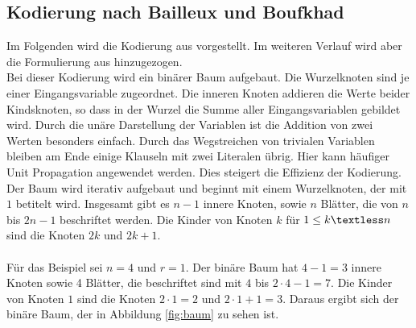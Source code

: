 \documentclass[a4,abstract=on]{scrartcl}
\begin{document}
	\subsection{Kodierung nach Bailleux und Boufkhad}
Im Folgenden wird die Kodierung aus \citet[][]{bailleux} vorgestellt. Im weiteren Verlauf wird aber die Formulierung aus \citet[][]{knuth} hinzugezogen.\\
Bei dieser Kodierung wird ein binärer Baum aufgebaut. Die Wurzelknoten sind je einer Eingangsvariable zugeordnet. Die inneren Knoten addieren die Werte beider Kindsknoten, so dass in der Wurzel die Summe aller Eingangsvariablen gebildet wird. Durch die unäre Darstellung der Variablen ist die Addition von zwei Werten besonders einfach. Durch das Wegstreichen von trivialen Variablen bleiben am Ende einige Klauseln mit zwei Literalen übrig. Hier kann häufiger Unit Propagation angewendet werden. Dies steigert die Effizienz der Kodierung.\\
Der Baum wird iterativ aufgebaut und beginnt mit einem Wurzelknoten, der mit $1$ betitelt wird. Insgesamt gibt es $n-1$ innere Knoten, sowie $n$ Blätter, die von $n$ bis $2n-1$ beschriftet werden. Die Kinder von Knoten $k$  für $1 \leq k \textless n$ sind die Knoten $2k$ und $2k +1$.\\
\ \\
Für das Beispiel sei $n=4$ und $r =1$. Der binäre Baum hat $4-1 = 3$ innere Knoten sowie 4 Blätter, die beschriftet sind mit $4$ bis $2\cdot4-1=7$. Die Kinder von Knoten $1$ sind die Knoten $2\cdot1=2$ und $2\cdot1 +1=3$. Daraus ergibt sich der binäre Baum, der in Abbildung \ref{fig:baum} zu sehen ist.
\end{document}
